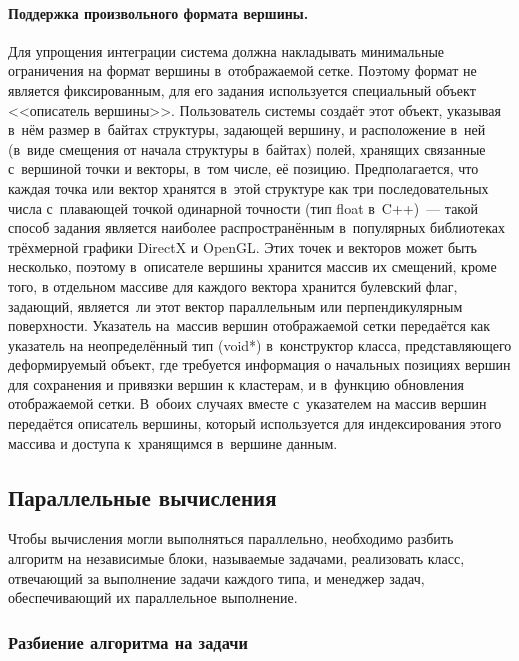 \documentclass[a4paper, 14pt, titlepage]{extarticle}
\newcommand{\eng}[1]{{\English #1}}
\begin{document}
        \paragraph{Поддержка произвольного формата вершины.}
        Для упрощения интеграции система должна накладывать минимальные ограничения на формат
        вершины в~отображаемой сетке. Поэтому формат не является фиксированным, для его задания
        используется специальный объект <<описатель вершины>>. Пользователь системы создаёт этот
        объект, указывая в~нём размер в~байтах структуры, задающей вершину, и расположение в~ней
        (в~виде смещения от начала структуры в~байтах) полей, хранящих связанные с~вершиной точки и
        векторы, в~том числе, её позицию.  Предполагается, что каждая точка или вектор хранятся
        в~этой структуре как три последовательных числа с~плавающей точкой одинарной точности (тип
        \eng{float} в~C++)~--- такой способ задания является наиболее распространённым в~популярных
        библиотеках трёхмерной графики \eng{DirectX} и \eng{OpenGL}. Этих точек и %
        векторов может быть несколько, поэтому в~описателе вершины хранится массив их смещений,
        кроме того, в отдельном массиве для каждого вектора хранится булевский флаг, задающий,
        является~ли этот вектор параллельным или перпендикулярным поверхности. Указатель на~массив
        вершин отображаемой сетки передаётся как указатель на неопределённый тип (void*)
        в~конструктор класса, представляющего деформируемый объект, где требуется информация о
        начальных позициях вершин для сохранения и привязки вершин к кластерам, и в~функцию
        обновления отображаемой сетки. В~обоих случаях вместе с~указателем на массив вершин
        передаётся описатель вершины, который используется для индексирования этого массива и
        доступа к~хранящимся в~вершине данным.

    \subsection{Параллельные вычисления}

      Чтобы вычисления могли выполняться параллельно, необходимо разбить алгоритм на независимые
      блоки, называемые задачами, реализовать класс, отвечающий за выполнение задачи каждого типа, и
      менеджер задач, обеспечивающий их параллельное выполнение.
      \subsubsection{Разбиение алгоритма на задачи}
\end{document}
